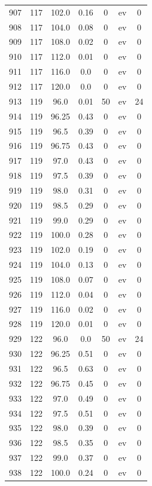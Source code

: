 \documentclass[12pt,a4paper]{article}
\begin{document}
\begin{tabular}{r|cccccc}
	907 & 117 & 102.0 & 0.16 & 0 & ev & 0 \\
	908 & 117 & 104.0 & 0.08 & 0 & ev & 0 \\
	909 & 117 & 108.0 & 0.02 & 0 & ev & 0 \\
	910 & 117 & 112.0 & 0.01 & 0 & ev & 0 \\
	911 & 117 & 116.0 & 0.0 & 0 & ev & 0 \\
	912 & 117 & 120.0 & 0.0 & 0 & ev & 0 \\
	913 & 119 & 96.0 & 0.01 & 50 & ev & 24 \\
	914 & 119 & 96.25 & 0.43 & 0 & ev & 0 \\
	915 & 119 & 96.5 & 0.39 & 0 & ev & 0 \\
	916 & 119 & 96.75 & 0.43 & 0 & ev & 0 \\
	917 & 119 & 97.0 & 0.43 & 0 & ev & 0 \\
	918 & 119 & 97.5 & 0.39 & 0 & ev & 0 \\
	919 & 119 & 98.0 & 0.31 & 0 & ev & 0 \\
	920 & 119 & 98.5 & 0.29 & 0 & ev & 0 \\
	921 & 119 & 99.0 & 0.29 & 0 & ev & 0 \\
	922 & 119 & 100.0 & 0.28 & 0 & ev & 0 \\
	923 & 119 & 102.0 & 0.19 & 0 & ev & 0 \\
	924 & 119 & 104.0 & 0.13 & 0 & ev & 0 \\
	925 & 119 & 108.0 & 0.07 & 0 & ev & 0 \\
	926 & 119 & 112.0 & 0.04 & 0 & ev & 0 \\
	927 & 119 & 116.0 & 0.02 & 0 & ev & 0 \\
	928 & 119 & 120.0 & 0.01 & 0 & ev & 0 \\
	929 & 122 & 96.0 & 0.0 & 50 & ev & 24 \\
	930 & 122 & 96.25 & 0.51 & 0 & ev & 0 \\
	931 & 122 & 96.5 & 0.63 & 0 & ev & 0 \\
	932 & 122 & 96.75 & 0.45 & 0 & ev & 0 \\
	933 & 122 & 97.0 & 0.49 & 0 & ev & 0 \\
	934 & 122 & 97.5 & 0.51 & 0 & ev & 0 \\
	935 & 122 & 98.0 & 0.39 & 0 & ev & 0 \\
	936 & 122 & 98.5 & 0.35 & 0 & ev & 0 \\
	937 & 122 & 99.0 & 0.37 & 0 & ev & 0 \\
	938 & 122 & 100.0 & 0.24 & 0 & ev & 0 \\

\end{tabular}
\end{document}
